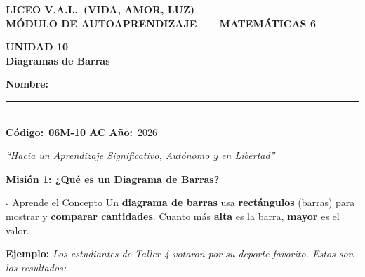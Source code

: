 \documentclass[12pt,letterpaper]{article}
\newcommand{\mision}[2]{%
	\needspace{4cm}%
	\vspace{4pt}%
	\begin{tcolorbox}[
		enhanced, colback=#1, colframe=#1!60!black, arc=3mm, boxrule=1.5pt,
		left=6pt, right=6pt, top=4pt, bottom=4pt,
		]
		{\large\bfseries\color{white} #2}
	\end{tcolorbox}%
	\vspace{2pt}%
}
\begin{document}
	
	\begin{center}
		{\Large\bfseries\color{valblue} LICEO V.A.L.\ (VIDA, AMOR, LUZ)}\\[4pt]
		{\large\bfseries MÓDULO DE AUTOAPRENDIZAJE\ ---\ MATEMÁTICAS 6\textdegree}\\[8pt]
		\begin{tcolorbox}[enhanced,arc=6mm,boxrule=2pt,
			colback=valblue,colframe=valdark,halign=center]
			{\Huge\bfseries\color{white} UNIDAD 10}\\[4pt]
			{\Large\bfseries\color{yellow!90!white} Diagramas de Barras}
		\end{tcolorbox}
		\begin{tcolorbox}[enhanced,arc=4mm,boxrule=1.5pt,
			colback=white,colframe=valblue,width=0.88\linewidth,halign=center]
			{\bfseries Nombre:}\\[6pt]
			\rule{9cm}{0.5pt}\\[6pt]
			{\bfseries Código:}\ \textbf{06M-10 AC}
			\hspace{2cm}
			{\bfseries Año:}\ \underline{2026}
		\end{tcolorbox}
		{\itshape ``Hacia un Aprendizaje Significativo, Autónomo y en Libertad''}
	\end{center}
	
	\mision{valblue}{Misión 1: ¿Qué es un Diagrama de Barras?}
	
	\begin{concepto}{$\square$ Aprende el Concepto}
		Un \textbf{diagrama de barras} usa \textbf{rectángulos} (barras) para
		mostrar y \textbf{comparar cantidades}.
		Cuanto más \textbf{alta} es la barra, \textbf{mayor} es el valor.
		
		\vspace{6pt}
		\textbf{Ejemplo: }\textit{Los estudiantes de Taller 4 votaron por su deporte favorito.
			Estos son los resultados:}
	\end{concepto}
	
\end{document}
